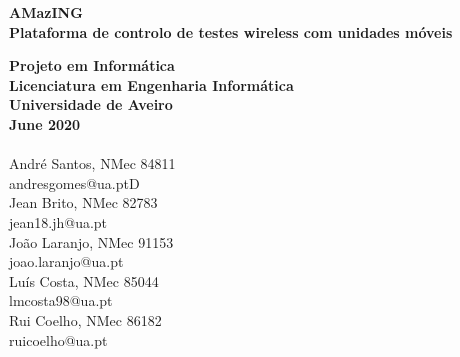 \thispagestyle{empty} %
\vspace*{\fill}
\sffamily

\Large{
\noindent
\textbf{AMazING}\\
\textbf{Plataforma de controlo de testes wireless com unidades móveis}\\
}

\small
\noindent
\textbf{Projeto em Informática}\\
\textbf{Licenciatura em Engenharia Informática}\\
\textbf{Universidade de Aveiro}\\
\textbf{June 2020}\\
\\
André Santos, NMec 84811\\
andresgomes@ua.ptD\\
Jean Brito, NMec 82783\\
jean18.jh@ua.pt\\
João Laranjo, NMec 91153\\
joao.laranjo@ua.pt\\
Luís Costa, NMec 85044\\
lmcosta98@ua.pt\\
Rui Coelho, NMec 86182\\
ruicoelho@ua.pt
\normalsize
\normalfont
\vspace*{2.5cm}
